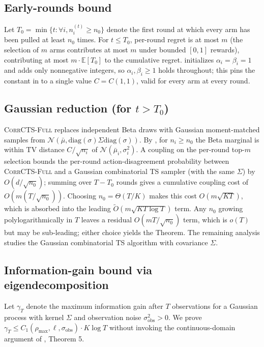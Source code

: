 \documentclass{article}
\theoremstyle{plain}
\theoremstyle{definition}
\theoremstyle{remark}
\newcommand{\E}{\mathbb{E}}
\newcommand{\CorrFull}{\textsc{CorrCTS-Full}}
\begin{document}
\subsection{Early-rounds bound}\label{app:bayes:early}

Let $T_0 = \min\{t : \forall i, n_i^{(t)} \geq n_0\}$ denote the first round at which every arm has been pulled at least $n_0$ times.
For $t \leq T_0$, per-round regret is at most $m$ (the selection of $m$ arms contributes at most $m$ under bounded $[0,1]$ rewards), contributing at most $m \cdot \E[T_0]$ to the cumulative regret.
 initializes $\alpha_i = \beta_i = 1$ and adds only nonnegative integers, so $\alpha_i, \beta_i \geq 1$ holds throughout; this pins the constant in  to a single value $C = C(1,1)$, valid for every arm at every round.

\subsection{Gaussian reduction (for $t > T_0$)}\label{app:bayes:reduction}

\CorrFull{} replaces independent Beta draws with Gaussian moment-matched samples from $\mathcal{N}(\bar\mu, \mathrm{diag}(\sigma) \Sigma \mathrm{diag}(\sigma))$.
By , for $n_i \geq n_0$ the Beta marginal is within TV distance $C/\sqrt{n_i}$ of $\mathcal{N}(\bar\mu_i, \sigma_i^2)$.
A coupling on the per-round top-$m$ selection bounds the per-round action-disagreement probability between \CorrFull{} and a Gaussian combinatorial TS sampler (with the same $\Sigma$) by $O(d/\sqrt{n_0})$; summing over $T - T_0$ rounds gives a cumulative coupling cost of $O(m (T/\sqrt{n_0}))$.
Choosing $n_0 = \Theta(T/K)$ makes this cost $O(m \sqrt{KT})$, which is absorbed into the leading $\tilde O(m \sqrt{KT \log T})$ term. Any $n_0$ growing polylogarithmically in $T$ leaves a residual $O(m T / \sqrt{n_0})$ term, which is $o(T)$ but may be sub-leading; either choice yields the Theorem.
The remaining analysis studies the Gaussian combinatorial TS algorithm with covariance $\Sigma$.

\subsection{Information-gain bound via eigendecomposition}\label{app:bayes:gamma}

Let $\gamma_T$ denote the maximum information gain after $T$ observations for a Gaussian process with kernel $\Sigma$ and observation noise $\sigma_{\mathrm{obs}}^2 > 0$.
We prove $\gamma_T \leq C_1(\rho_{\max}, \ell, \sigma_{\mathrm{obs}}) \cdot K \log T$ without invoking the continuous-domain argument of \citet{srinivas2010gpucb}, Theorem 5.
\end{document}
